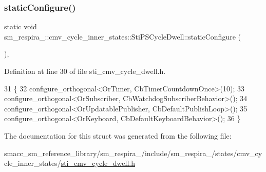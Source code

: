 \subsubsection{\texorpdfstring{static\+Configure()}{staticConfigure()}}
{\footnotesize\ttfamily static void sm\+\_\+respira\+\_\+::cmv\+\_\+cycle\+\_\+inner\+\_\+states\+::\+Sti\+P\+S\+Cycle\+Dwell\+::static\+Configure (\begin{DoxyParamCaption}{ }\end{DoxyParamCaption})\hspace{0.3cm}{\ttfamily [inline]}, {\ttfamily [static]}}



Definition at line 30 of file sti\+\_\+cmv\+\_\+cycle\+\_\+dwell.\+h.


\begin{DoxyCode}
31   \{
32     configure\_orthogonal<OrTimer, CbTimerCountdownOnce>(10);
33     configure\_orthogonal<OrSubscriber, CbWatchdogSubscriberBehavior>();
34     configure\_orthogonal<OrUpdatablePublisher, CbDefaultPublishLoop>();
35     configure\_orthogonal<OrKeyboard, CbDefaultKeyboardBehavior>();
36   \}
\end{DoxyCode}


The documentation for this struct was generated from the following file\+:\begin{DoxyCompactItemize}
\item 
smacc\+\_\+sm\+\_\+reference\+\_\+library/sm\+\_\+respira\+\_/include/sm\+\_\+respira\+\_/states/cmv\+\_\+cycle\+\_\+inner\+\_\+states/\hyperlink{sti__cmv__cycle__dwell_8h}{sti\+\_\+cmv\+\_\+cycle\+\_\+dwell.\+h}\end{DoxyCompactItemize}
